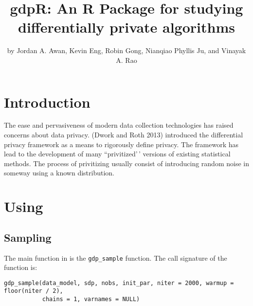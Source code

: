 \title{gdpR: An R Package for studying differentially private algorithms}


\author{by Jordan A. Awan, Kevin Eng, Robin Gong, Nianqiao Phyllis Ju, and Vinayak A. Rao}

\maketitle


\hypertarget{introduction}{%
\section{Introduction}\label{introduction}}

The ease and pervasiveness of modern data collection technologies has raised
concerns about data privacy. (Dwork and Roth 2013) introduced the differential privacy
framework as a means to rigorously define privacy. The framework has lead to the
development of many ``privitized'\,' versions of existing statistical methods. The
process of privitizing usually consist of introducing random noise in someway using
a known distribution.

\hypertarget{using}{%
\section{\texorpdfstring{Using }{Using }}\label{using}}

\hypertarget{sampling}{%
\subsection{Sampling}\label{sampling}}

The main function in  is the \texttt{gdp\_sample} function. The call
signature of the function is:

\begin{verbatim}
gdp_sample(data_model, sdp, nobs, init_par, niter = 2000, warmup = floor(niter / 2),
           chains = 1, varnames = NULL)
\end{verbatim}

